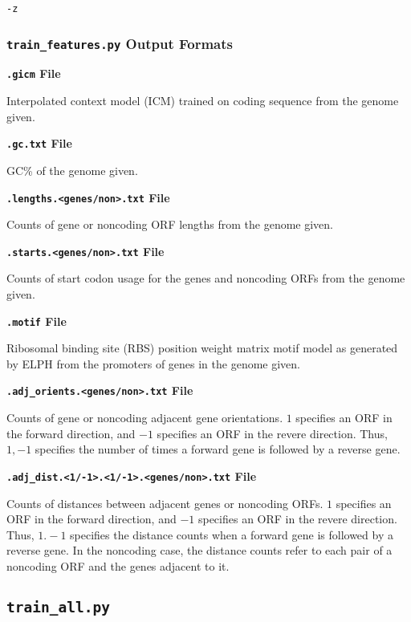 \documentclass[fleqn,titlepage,11pt]{article}
\def\Pg#1{\texttt{#1}}
\begin{document}
\exdent
  \verb`-z`

\el

\subsubsection{\Pg{train\_features.py} Output Formats}

\smallskip
\noindent\textbf{\Pg{.gicm} File}
\smallskip

Interpolated context model (ICM) trained on coding sequence from the
genome given.

\smallskip
\noindent\textbf{\Pg{.gc.txt} File}
\smallskip

GC\% of the genome given.

\smallskip
\noindent\textbf{\Pg{.lengths.<genes/non>.txt} File}
\smallskip

Counts of gene or noncoding ORF lengths from the genome given.

\smallskip
\noindent\textbf{\Pg{.starts.<genes/non>.txt} File}
\smallskip

Counts of start codon usage for the genes and noncoding ORFs
from the genome given.

\smallskip
\noindent\textbf{\Pg{.motif} File}
\smallskip

Ribosomal binding site (RBS) position weight matrix motif model
as generated by ELPH from the promoters of genes in the genome
given.

\smallskip
\noindent\textbf{\Pg{.adj\_orients.<genes/non>.txt} File}
\smallskip

Counts of gene or noncoding adjacent gene orientations. $1$ specifies
an ORF in the forward direction, and $-1$ specifies an ORF in the
revere direction. Thus, $1,-1$ specifies the number of times a forward
gene is followed by a reverse gene.

\smallskip
\noindent\textbf{\Pg{.adj\_dist.<1/-1>.<1/-1>.<genes/non>.txt} File}
\smallskip

Counts of distances between adjacent genes or noncoding ORFs. $1$
specifies an ORF in the forward direction, and $-1$ specifies an ORF
in the revere direction. Thus, $1.-1$ specifies the distance counts
when a forward gene is followed by a reverse gene. In the noncoding
case, the distance counts refer to each pair of a noncoding ORF and
the genes adjacent to it.

\subsection{\Pg{train\_all.py}}
\end{document}
